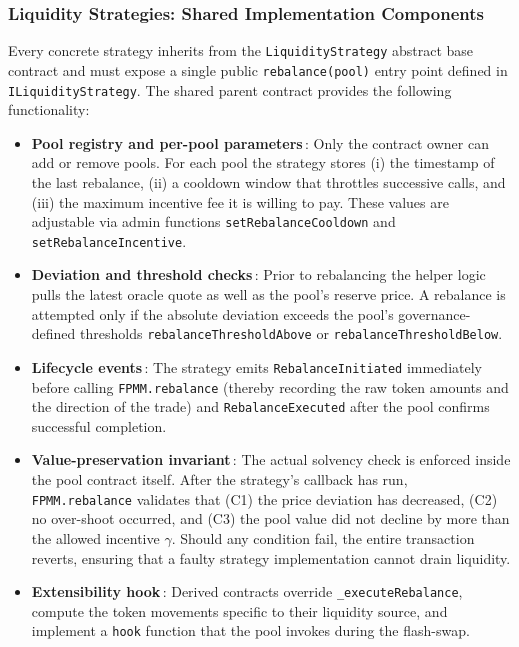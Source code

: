 \documentclass[a4paper]{article}
\providecommand{\hyp}{-}
\theoremstyle{definition}
\begin{document}
\subsubsection{Liquidity Strategies: Shared Implementation Components}\label{str:onchain}
Every concrete strategy inherits from the \verb|LiquidityStrategy| abstract base contract and must expose a single public \verb|rebalance(pool)| entry point defined in \verb|ILiquidityStrategy|.  The shared parent contract provides the following functionality:
\begin{itemize}[leftmargin=*]
  \item \textbf{Pool registry and per\hyp pool parameters}\,: Only the contract owner can add or remove pools.  For each pool the strategy stores (i) the timestamp of the last rebalance, (ii) a cooldown window that throttles successive calls, and (iii) the maximum incentive fee it is willing to pay.  These values are adjustable via admin functions \verb|setRebalanceCooldown| and \verb|setRebalanceIncentive|.
  \item \textbf{Deviation and threshold checks}\,: Prior to rebalancing the helper logic pulls the latest oracle quote as well as the pool's reserve price.  A rebalance is attempted only if the absolute deviation exceeds the pool's governance\hyp defined thresholds \verb|rebalanceThresholdAbove| or \verb|rebalanceThresholdBelow|.
  \item \textbf{Lifecycle events}\,: The strategy emits \verb|RebalanceInitiated| immediately before calling \verb|FPMM.rebalance| (thereby recording the raw token amounts and the direction of the trade) and \verb|RebalanceExecuted| after the pool confirms successful completion.
  \item \textbf{Value-preservation invariant}\,: The actual solvency check is enforced inside the pool contract itself.  After the strategy's callback has run, \verb|FPMM.rebalance| validates that (C1) the price deviation has decreased, (C2) no over\hyp shoot occurred, and (C3) the pool value did not decline by more than the allowed incentive \(\gamma\).  Should any condition fail, the entire transaction reverts, ensuring that a faulty strategy implementation cannot drain liquidity.
  \item \textbf{Extensibility hook}\,: Derived contracts override \verb|_executeRebalance|, compute the token movements specific to their liquidity source, and implement a \verb|hook| function that the pool invokes during the flash\hyp swap.
\end{itemize}
\end{document}
